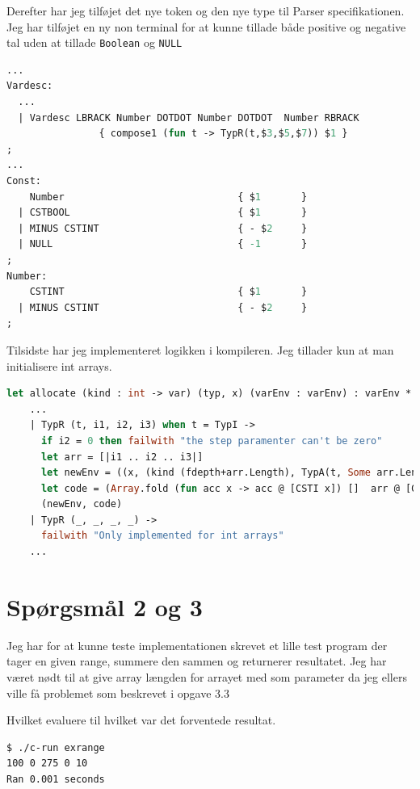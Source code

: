 \documentclass[danish,a4paper]{report}
\begin{document}
Derefter har jeg tilføjet det nye token og den nye type til Parser specifikationen. Jeg har tilføjet en ny non terminal for at kunne tillade både positive og negative tal uden at tillade \texttt{Boolean} og \texttt{NULL}

\begin{lstlisting}[language=ML]
%token BAR DOTDOT
...
Vardesc: 
  ... 
  | Vardesc LBRACK Number DOTDOT Number DOTDOT  Number RBRACK 
                { compose1 (fun t -> TypR(t,$3,$5,$7)) $1 }
;
...
Const:
    Number                              { $1       }
  | CSTBOOL                             { $1       }
  | MINUS CSTINT                        { - $2     }
  | NULL                                { -1       }
;
Number:
    CSTINT                              { $1       }
  | MINUS CSTINT                        { - $2     }
;
\end{lstlisting}

Tilsidste har jeg implementeret logikken i kompileren. Jeg tillader kun at man initialisere int arrays.

\begin{lstlisting}[language=ML]
let allocate (kind : int -> var) (typ, x) (varEnv : varEnv) : varEnv * instr list =
    ...
    | TypR (t, i1, i2, i3) when t = TypI ->
      if i2 = 0 then failwith "the step paramenter can't be zero"
      let arr = [|i1 .. i2 .. i3|]
      let newEnv = ((x, (kind (fdepth+arr.Length), TypA(t, Some arr.Length))) :: env, fdepth+arr.Length+1)
      let code = (Array.fold (fun acc x -> acc @ [CSTI x]) []  arr @ [GETSP; CSTI (arr.Length - 1); SUB])
      (newEnv, code) 
    | TypR (_, _, _, _) ->
      failwith "Only implemented for int arrays"
    ...
\end{lstlisting}

\section*{Spørgsmål 2 og 3}

Jeg har for at kunne teste implementationen skrevet et lille test program der tager en given range, summere den sammen og returnerer resultatet. Jeg har været nødt til at give array længden for arrayet med som parameter da jeg ellers ville få problemet som beskrevet i opgave 3.3



Hvilket evaluere til hvilket var det forventede resultat.

\begin{lstlisting}[language=bash]
$ ./c-run exrange
100 0 275 0 10
Ran 0.001 seconds
\end{lstlisting}
\end{document}
